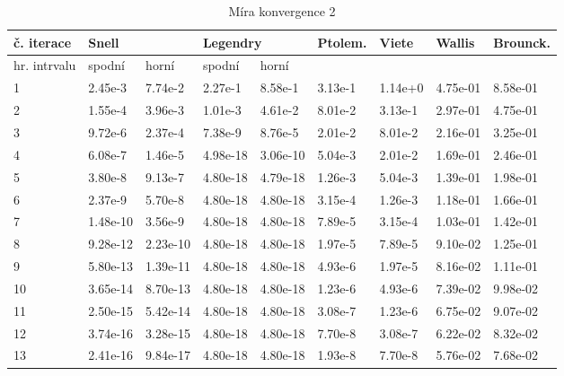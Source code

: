 \documentclass[rocnikovka]{gzwroc} %
\begin{document}
\begin{table}[h!]
\caption{Míra konvergence 2}
\begin{tabular}{|l|l|l|l|l|l|l|l|l|}
\hline
\multicolumn{1}{|l|}{\bfseries č. iterace} & \multicolumn{2}{l|}{\bfseries Snell} & \multicolumn{2}{l|}{\bfseries Legendry} & \multicolumn{1}{l|}{\bfseries Ptolem.} & \multicolumn{1}{l|}{\bfseries Viete} & \multicolumn{1}{l|}{\bfseries Wallis} & \multicolumn{1}{l|}{\bfseries Brounck.}  \\ \hline
\multicolumn{1}{|l|}{hr. intrvalu} & \multicolumn{1}{l|}{spodní} & \multicolumn{1}{l|}{horní} & \multicolumn{1}{l|}{spodní} & \multicolumn{1}{l|}{horní} & \multicolumn{1}{l|}{} & \multicolumn{1}{l|}{} & \multicolumn{1}{l|}{} & \multicolumn{1}{l|}{} \\ \hline \hline
1 & 2.45e-3 & 7.74e-2 & 2.27e-1 & 8.58e-1 & 3.13e-1 & 1.14e+0 & 4.75e-01 & 8.58e-01 \\ \hline 
2 & 1.55e-4 & 3.96e-3 & 1.01e-3 & 4.61e-2 & 8.01e-2 & 3.13e-1 & 2.97e-01 & 4.75e-01 \\ \hline 
3 & 9.72e-6 & 2.37e-4 & 7.38e-9 & 8.76e-5 & 2.01e-2 & 8.01e-2 & 2.16e-01 & 3.25e-01 \\ \hline 
4 & 6.08e-7 & 1.46e-5 & 4.98e-18 & 3.06e-10 & 5.04e-3 & 2.01e-2 & 1.69e-01 & 2.46e-01 \\ \hline 
5 & 3.80e-8 & 9.13e-7 & 4.80e-18 & 4.79e-18 & 1.26e-3 & 5.04e-3 & 1.39e-01 & 1.98e-01 \\ \hline 
6 & 2.37e-9 & 5.70e-8 & 4.80e-18 & 4.80e-18 & 3.15e-4 & 1.26e-3 & 1.18e-01 & 1.66e-01 \\ \hline 
7 & 1.48e-10 & 3.56e-9 & 4.80e-18 & 4.80e-18 & 7.89e-5 & 3.15e-4 & 1.03e-01 & 1.42e-01 \\ \hline 
8 & 9.28e-12 & 2.23e-10 & 4.80e-18 & 4.80e-18 & 1.97e-5 & 7.89e-5 & 9.10e-02 & 1.25e-01 \\ \hline 
9 & 5.80e-13 & 1.39e-11 & 4.80e-18 & 4.80e-18 & 4.93e-6 & 1.97e-5 & 8.16e-02 & 1.11e-01 \\ \hline 
10 & 3.65e-14 & 8.70e-13 & 4.80e-18 & 4.80e-18 & 1.23e-6 & 4.93e-6 & 7.39e-02 & 9.98e-02 \\ \hline 
11 & 2.50e-15 & 5.42e-14 & 4.80e-18 & 4.80e-18 & 3.08e-7 & 1.23e-6 & 6.75e-02 & 9.07e-02 \\ \hline 
12 & 3.74e-16 & 3.28e-15 & 4.80e-18 & 4.80e-18 & 7.70e-8 & 3.08e-7 & 6.22e-02 & 8.32e-02 \\ \hline 
13 & 2.41e-16 & 9.84e-17 & 4.80e-18 & 4.80e-18 & 1.93e-8 & 7.70e-8 & 5.76e-02 & 7.68e-02 \\ \hline 

\end{tabular}
\end{table}
\end{document}
